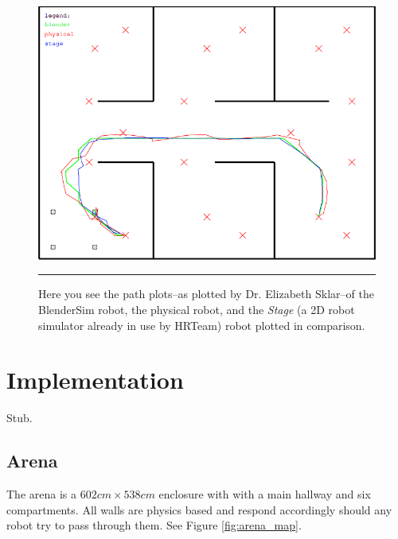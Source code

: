 \begin{figure}[htbp]
\centering
\includegraphics[scale=0.55]{../Figures/Chapter5/const_motion_model_plotted.png}
\rule{35em}{0.5pt}
\caption[Comparative Path Plots]{Here you see the path plots--as plotted by Dr. Elizabeth Sklar--of the BlenderSim robot, the physical robot, and the \textit{Stage} (a 2D robot simulator already in use by HRTeam)\cite{website:stage} robot plotted in comparison.}
\label{sklarplots}
\end{figure}

\section{Implementation}

Stub.

\subsection{Arena}

The arena is a $602cm\times538cm$ enclosure with with a main hallway and six compartments. All walls are physics based and respond accordingly should any robot try to pass through them. See Figure \ref{fig:arena_map}. 

